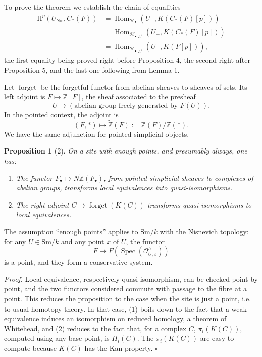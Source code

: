 \documentclass[11pt]{article}
\newcommand{\Z}{\mathbb Z}
\newcommand{\Nis}{\mathrm{Nis}}
\newcommand{\Sm}{\mathrm{Sm}}
\newcommand{\Spec}{\operatorname{Spec}}
\newcommand{\Hom}{\operatorname{Hom}}
\newcommand{\forget}{\operatorname{forget}}
\newcommand{\Hob}{\mathcal H_\bullet}
\newcommand{\HoA}{\mathcal H_{\bullet,A^1}}
\newcommand{\pt}{*}
\newcommand{\ZZ}{\widetilde{\Z}}
\newcommand{\HH}{\mathrm H}
\theoremstyle{deligne}
\newtheorem*{proposition*}{Proposition}
\newenvironment{proofdel}{\noindent\textit{Proof.}}{\hfill$\square$}
\begin{document}
To prove the theorem we establish the chain of equalities
\[
\begin{aligned}
\HH^p(U_{\Nis},C_*(F))
&=\Hom_{\Hob}(U_+,K(C_*(F)[p])) \\
&=\Hom_{\HoA}(U_+,K(C_*(F)[p])) \\
&=\Hom_{\HoA}(U_+,K(F[p])),
\end{aligned}\tag{1.1}
\]
the first equality being proved right before Proposition 4, the second right after Proposition 5, and the last one following from Lemma 1.

Let \(\forget\) be the forgetful functor from abelian sheaves to sheaves of sets. Its left adjoint is \(F\mapsto \Z[F]\), the sheaf associated to the presheaf
\[
  U\longmapsto (\text{abelian group freely generated by }F(U)).
\]
In the pointed context, the adjoint is
\[
  (F,\pt)\longmapsto \ZZ(F):=\Z(F)/\Z(\pt).
\]
We have the same adjunction for pointed simplicial objects.

\begin{proposition*}[2]
On a site with enough points, and presumably always, one has:
\begin{enumerate}[label=(\arabic*)]
\item The functor \(F_\bullet\mapsto N\ZZ(F_\bullet)\), from pointed simplicial sheaves to complexes of abelian groups, transforms local equivalences into quasi-isomorphisms.
\item The right adjoint \(C\mapsto \forget(K(C))\) transforms quasi-isomorphisms to local equivalences.
\end{enumerate}
\end{proposition*}

The assumption ``enough points'' applies to \(\Sm/k\) with the Nisnevich topology: for any \(U\in\Sm/k\) and any point \(x\) of \(U\), the functor
\[
  F\longmapsto F(\Spec(\mathcal O^h_{U,x}))
\]
is a point, and they form a conservative system.

\begin{proofdel}
Local equivalence, respectively quasi-isomorphism, can be checked point by point, and the two functors considered commute with passage to the fibre at a point. This reduces the proposition to the case when the site is just a point, i.e. to usual homotopy theory. In that case, (1) boils down to the fact that a weak equivalence induces an isomorphism on reduced homology, a theorem of Whitehead, and (2) reduces to the fact that, for a complex \(C\), \(\pi_i(K(C))\), computed using any base point, is \(H_i(C)\). The \(\pi_i(K(C))\) are easy to compute because \(K(C)\) has the Kan property.
\end{proofdel}
\end{document}
